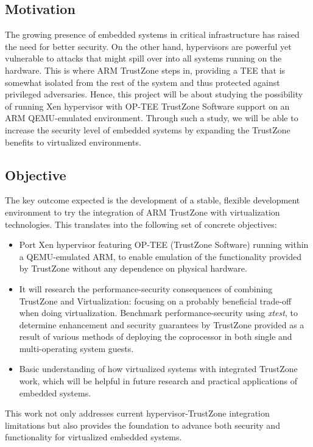 \documentclass[acmtog]{acmart}
\begin{document}
\subsection{Motivation}
The growing presence of embedded systems in critical infrastructure has raised the need for better security. On the other hand, hypervisors are powerful yet vulnerable to attacks that might spill over into all systems running on the hardware. This is where ARM TrustZone steps in, providing a TEE that is somewhat isolated from the rest of the system and thus protected against privileged adversaries. Hence, this project will be about studying the possibility of running Xen hypervisor with OP-TEE TrustZone Software support on an ARM QEMU-emulated environment. Through such a study, we will be able to increase the security level of embedded systems by expanding the TrustZone benefits to virtualized environments.



\subsection{Objective}
The key outcome expected is the development of a stable, flexible development environment to try the integration of ARM TrustZone with virtualization technologies. This translates into the following set of concrete objectives:
\begin{itemize}
    \item Port Xen hypervisor featuring OP-TEE (TrustZone Software) running within a QEMU-emulated ARM, to enable emulation of the functionality provided by TrustZone without any dependence on physical hardware.
    \item It will research the performance-security consequences of combining TrustZone and Virtualization: focusing on a probably beneficial trade-off when doing virtualization. Benchmark performance-security using \textit{xtest}, to determine enhancement and security guarantees by TrustZone provided as a result of various methods of deploying the coprocessor in both single and multi-operating system guests.
    \item Basic understanding of how virtualized systems with integrated TrustZone work, which will be helpful in future research and practical applications of embedded systems.
  \end{itemize}

 This work not only addresses current hypervisor-TrustZone integration limitations but also provides the foundation to advance both security and functionality for virtualized embedded systems.
\end{document}
